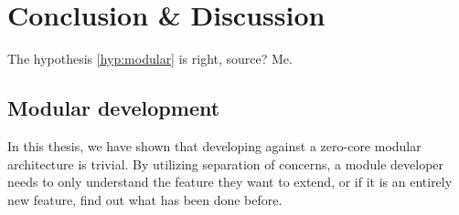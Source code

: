 \chapter{Conclusion \& Discussion} \label{cha:conclusion}

The hypothesis \ref{hyp:modular} is right, source? Me.

\section{Modular development}

In this thesis, we have shown that developing against a zero-core modular
architecture is trivial. By utilizing separation of concerns, a module developer
needs to only understand the feature they want to extend, or if it is an
entirely new feature, find out what has been done before.

